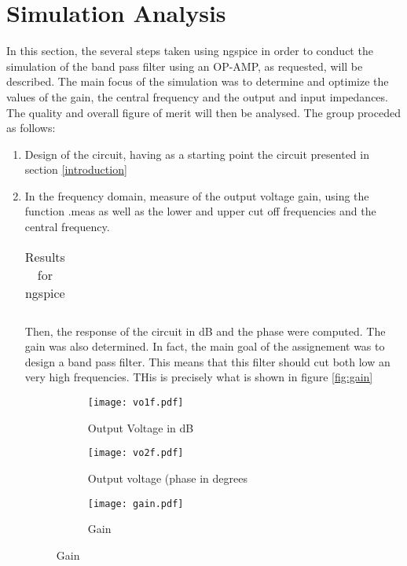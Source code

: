 \section{Simulation Analysis}
\label{section:sim}
 
In this section, the several steps taken using ngspice in order to conduct the simulation of the band pass filter using an OP-AMP, as requested, will be described. The main focus of the simulation was to determine and optimize the values of the gain, the central frequency and the output and input impedances. The quality and overall figure of merit will then be analysed.
The group proceded as follows:

\begin{enumerate}
\item Design of the circuit, having as a starting point the circuit presented in section \ref{introduction}

  
\item  In the frequency domain, measure of the output voltage gain, using the function .meas as well as the lower and upper cut off frequencies and the central frequency.


\begin{table}[ht]
  \centering
  \begin{tabular}{|l|r|}
    \hline    
   
    \end{tabular}
  \caption{Results for ngspice}
    \label{tab:results}
\end{table}


Then, the response of the circuit in dB and the phase were computed. The gain was also determined. In fact, the main goal of the assignement was to design a band pass filter. This means that this filter should cut both low an very high frequencies. THis is precisely what is shown in figure \ref{fig:gain}




\begin{figure}[ht]
\centering
\begin{subfigure}{.5\textwidth}
  \centering
  \texttt{[image: vo1f.pdf]}
  \caption{Output Voltage in dB}
  \label{fig:sim5}
\end{subfigure}%
\begin{subfigure}{.5\textwidth}
  \centering
  \texttt{[image: vo2f.pdf]}
  \caption{Output voltage (phase in degrees}
  \label{fig:sim6}
  \end{subfigure}
  \begin{subfigure}{.5\textwidth}
  \centering
  \texttt{[image: gain.pdf]}
  \caption{Gain}
  \label{fig:sim6}


\end{subfigure}
\end{figure}
\end{enumerate}

